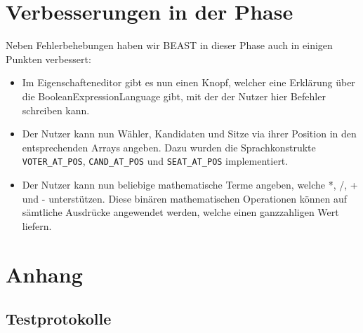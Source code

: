 ﻿\documentclass[a4paper]{scrreprt}
\begin{document}
\chapter{Verbesserungen in der Phase}
Neben Fehlerbehebungen haben wir BEAST in dieser Phase auch in einigen Punkten
verbessert:

\begin{itemize}
  \item Im Eigenschafteneditor gibt es nun einen Knopf, welcher eine Erklärung
  über die BooleanExpressionLanguage gibt, mit der der Nutzer hier Befehler
  schreiben kann.
  \item Der Nutzer kann nun Wähler, Kandidaten und Sitze via ihrer Position in den entsprechenden Arrays angeben. Dazu wurden die Sprachkonstrukte \verb!VOTER_AT_POS!, \verb!CAND_AT_POS! und \verb!SEAT_AT_POS! implementiert.
  \item Der Nutzer kann nun beliebige mathematische Terme angeben, welche *, /, + und - unterstützen. Diese binären mathematischen Operationen können auf sämtliche Ausdrücke angewendet werden, welche einen ganzzahligen Wert liefern.
\end{itemize}

\chapter{Anhang}

\section{Testprotokolle}







\end{document}
